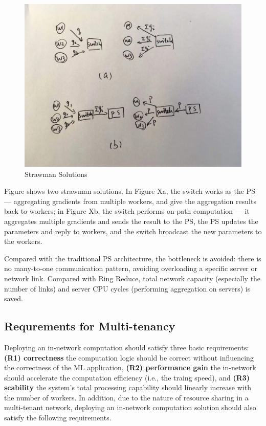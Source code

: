 \begin{figure}[htb]
\centering
\includegraphics[width=0.8\columnwidth]{figures/strawman.jpg}
\caption{Strawman Solutions}
\end{figure}

Figure  shows two strawman solutions. In Figure Xa, the switch works as the PS --- aggregating gradients from multiple workers, and give the aggregation results back to workers; in Figure Xb, the switch performs on-path computation --- it aggregates multiple gradients and sends the result to the PS, the PS updates the parameters and reply to workers, and the switch broadcast the new parameters to the workers.

Compared with the traditional PS architecture, the bottleneck is avoided: there is no many-to-one communication pattern, avoiding overloading a specific server or network link. Compared with Ring Reduce, total network capacity (especially the number of links) and server CPU cycles 
(performing aggregation on servers) is saved.


\subsection{Requrements for Multi-tenancy}
Deploying an in-network computation should satisfy three basic requirements: \textbf{(R1) correctness} the computation logic should be correct without influencing the correctness of the ML application,  \textbf{(R2) performance gain} the in-network should accelerate the computation efficiency (i.e., the traing speed), and \textbf{(R3) scability} the system's total processing capability should linearly increase with the number of workers. In addition, due to the nature of resource sharing in a multi-tenant network, deploying an in-network computation solution should also satisfy the following requirements.

